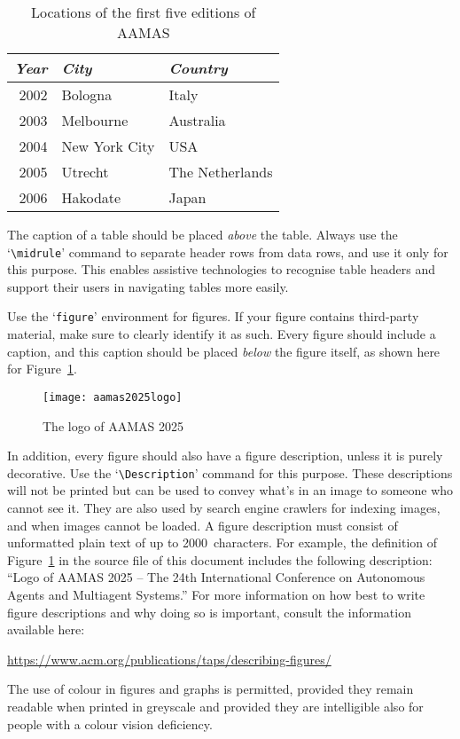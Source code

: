 \documentclass[sigconf]{aamas}
\begin{document}
\begin{table}[t]
	\caption{Locations of the first five editions of AAMAS}
	\label{tab:locations}
	\begin{tabular}{rll}\toprule
		\textit{Year} & \textit{City} & \textit{Country} \\ \midrule
		2002 & Bologna & Italy \\
		2003 & Melbourne & Australia \\
		2004 & New York City & USA \\
		2005 & Utrecht & The Netherlands \\
		2006 & Hakodate & Japan \\ \bottomrule
	\end{tabular}
\end{table}

The caption of a table should be placed \emph{above} the table. 
Always use the `\verb|\midrule|' command to separate header rows from 
data rows, and use it only for this purpose. This enables assistive 
technologies to recognise table headers and support their users in 
navigating tables more easily.

\balance

Use the `\texttt{figure}' environment for figures. If your figure 
contains third-party material, make sure to clearly identify it as such.
Every figure should include a caption, and this caption should be placed 
\emph{below} the figure itself, as shown here for Figure~\ref{fig:logo}.

\begin{figure}[h]
  \centering
  \texttt{[image: aamas2025logo]}
  \caption{The logo of AAMAS 2025}
  \label{fig:logo}
\end{figure}

In addition, every figure should also have a figure description, unless
it is purely decorative. Use the `\verb|\Description|' command for this 
purpose. These descriptions will not be printed but can be used to 
convey what's in an image to someone who cannot see it. They are also 
used by search engine crawlers for indexing images, and when images 
cannot be loaded. A figure description must consist of unformatted plain 
text of up to 2000~characters. For example, the definition of 
Figure~\ref{fig:logo} in the source file of this document includes the 
following description: ``Logo of AAMAS 2025 -- The 24th International Conference on Autonomous Agents and Multiagent Systems.'' For more information on how best to write figure descriptions 
and why doing so is important, consult the information available here: 
%
\begin{center}
\url{https://www.acm.org/publications/taps/describing-figures/}
\end{center}
%
The use of colour in figures and graphs is permitted, provided they 
remain readable when printed in greyscale and provided they are 
intelligible also for people with a colour vision deficiency.
\end{document}
